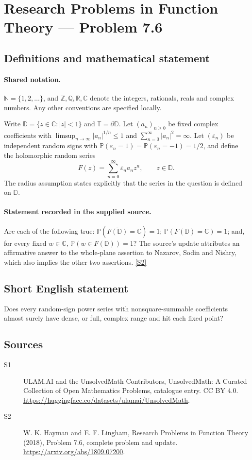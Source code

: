 \documentclass[11pt]{article}
\newcommand{\sref}[2]{\hyperlink{source:#1:#2}{[S#2]}}
\begin{document}
\section{Research Problems in Function Theory — Problem 7.6}\label{statement}

\subsection{Definitions and mathematical statement}

\paragraph{Shared notation.}$\mathbb N=\{1,2,\ldots\}$, and $\mathbb Z,\mathbb Q,\mathbb R,\mathbb C$ denote the integers, rationals, reals and complex numbers. Any other conventions are specified locally.


Write $\mathbb D=\{z\in\mathbb C:|z|<1\}$ and $\mathbb T=\partial\mathbb D$. Let $(a_n)_{n\geq0}$ be fixed complex coefficients with $\limsup_{n\to\infty}|a_n|^{1/n}\leq1$ and $\sum_{n=0}^{\infty}|a_n|^2=\infty$. Let $(\varepsilon_n)$ be independent random signs with $\mathbb P(\varepsilon_n=1)=\mathbb P(\varepsilon_n=-1)=1/2$, and define the holomorphic random series
\[F(z)=\sum_{n=0}^{\infty}\varepsilon_na_nz^n,\qquad z\in\mathbb D.\]
The radius assumption states explicitly that the series in the question is defined on $\mathbb D$.
\paragraph{Statement recorded in the supplied source.}
Are each of the following true: $\mathbb P(\overline{F(\mathbb D)}=\mathbb C)=1$; $\mathbb P(F(\mathbb D)=\mathbb C)=1$; and, for every fixed $w\in\mathbb C$, $\mathbb P(w\in F(\mathbb D))=1$? The source's update attributes an affirmative answer to the whole-plane assertion to Nazarov, Sodin and Nishry, which also implies the other two assertions. \sref{statement}{2}
\subsection{Short English statement}
Does every random-sign power series with nonsquare-summable coefficients almost surely have dense, or full, complex range and hit each fixed point?
\subsection{Sources}
\begin{description}
\item[\hypertarget{source:statement:1}{S1}] ULAM.AI and the UnsolvedMath Contributors, UnsolvedMath: A Curated Collection of Open Mathematics Problems, catalogue entry. CC BY 4.0. \url{https://huggingface.co/datasets/ulamai/UnsolvedMath}.
\item[\hypertarget{source:statement:2}{S2}] W. K. Hayman and E. F. Lingham, Research Problems in Function Theory (2018), Problem 7.6, complete problem and update. \url{https://arxiv.org/abs/1809.07200}.
\end{description}
\label{end:statement}
\end{document}
